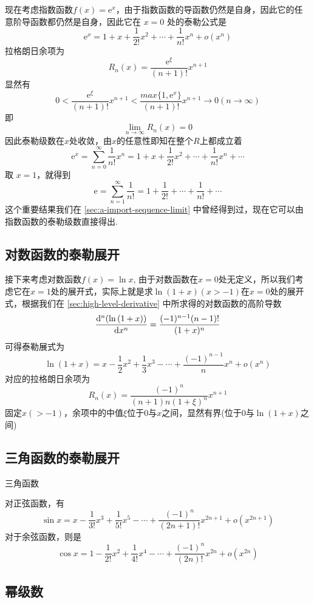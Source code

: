 现在考虑指数函数$f(x)=\mathrm{e}^x$，由于指数函数的导函数仍然是自身，因此它的任意阶导函数都仍然是自身，因此它在 $x=0$ 处的泰勒公式是
\[ \mathrm{e}^x = 1+x+\frac{1}{2!}x^2 + \cdots + \frac{1}{n!}x^n + o(x^n) \]
拉格朗日余项为
\[ R_n(x) = \frac{\mathrm{e}^{\xi}}{(n+1)!}x^{n+1} \]
显然有
\[ 0<\frac{\mathrm{e}^{\xi}}{(n+1)!}x^{n+1} < \frac{max\{1, \mathrm{e}^x\}}{(n+1)!}x^{n+1} \to 0 (n \to \infty) \]
即
\[ \lim_{n\to\infty}R_n(x) = 0 \]
因此泰勒级数在$x$处收敛，由$x$的任意性即知在整个$R$上都成立着
\[ \mathrm{e}^x = \sum_{n=0}^{\infty}\frac{1}{n!}x^n = 1+x+\frac{1}{2!}x^2+\cdots+\frac{1}{n!}x^n+\cdots \]
取 $x=1$，就得到
\[ \mathrm{e} = \sum_{n=1}^{\infty}\frac{1}{n!} =  1 + \frac{1}{2!} + \cdots + \frac{1}{n!} + \cdots \]
这个重要结果我们在 \autoref{sec:a-import-sequence-limit} 中曾经得到过，现在它可以由指数函数的泰勒级数直接得出.

\subsection{对数函数的泰勒展开}
\label{sec:taylor-expand-for-ln-function}

接下来考虑对数函数$f(x)=\ln{x}$, 由于对数函数在$x=0$处无定义，所以我们考虑它在$x=1$处的展开式，实际上就是求$\ln{(1+x)(x>-1)}$在$x=0$处的展开式，根据我们在 \autoref{sec:high-level-derivative} 中所求得的对数函数的高阶导数
\[ \frac{\mathop{}\!\mathrm{d}^n (\ln{(1+x)})}{\mathop{}\!\mathrm{d} x^n} = \frac{(-1)^{n-1}(n-1)!}{(1+x)^n} \]
可得泰勒展式为
\[ \ln{(1+x)} = x - \frac{1}{2} x^2 + \frac{1}{3} x^3 - \cdots + \frac{(-1)^{n-1}}{n}x^n + o(x^n) \]
对应的拉格朗日余项为
\[ R_n(x) = \frac{(-1)^{n}}{(n+1)n(1+\xi)^n}x^{n+1} \]
固定$x(>-1)$，余项中的中值$\xi$位于$0$与$x$之间，显然有界(位于$0$与$\ln(1+x)$之间)


\subsection{三角函数的泰勒展开}
\label{sec:taylor-expand-for-triangle-function}

三角函数

对正弦函数，有
\[ \sin{x} = x - \frac{1}{3!}x^3 + \frac{1}{5!} x^5 - \cdots + \frac{(-1)^n}{(2n+1)!}x^{2n+1} + o(x^{2n+1}) \]
对于余弦函数，则是
\[ \cos{x} = 1 - \frac{1}{2!}x^2 + \frac{1}{4!}x^4 - \cdots + \frac{(-1)^n}{(2n)!}x^{2n} + o(x^{2n}) \]

\subsection{幂级数}
\label{sec:power-series}



